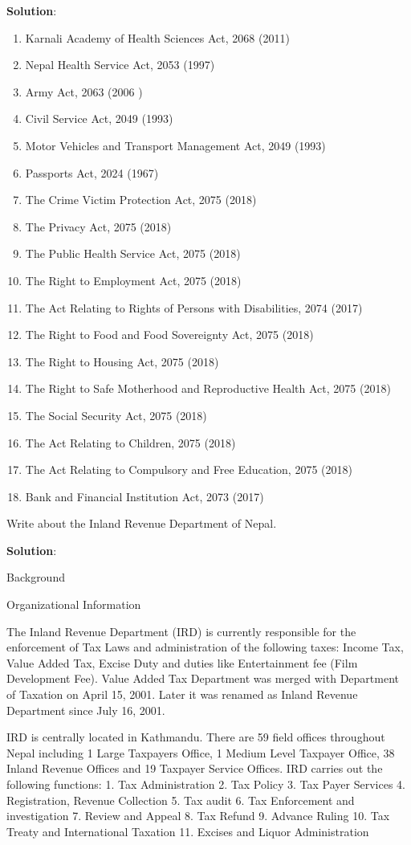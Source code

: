 \documentclass[
  openany]{book}
\newcommand{\question}{\item}
\newenvironment{solution}{ {\bfseries Solution}:}{}
\begin{document}
\begin{questions}
\begin{solution}
\begin{enumerate}
\item Karnali Academy of Health Sciences Act, 2068 (2011)
\item Nepal Health Service Act, 2053 (1997)
\item Army Act, 2063 (2006 )
\item Civil Service Act, 2049 (1993)
\item Motor Vehicles and Transport Management Act, 2049 (1993)
\item Passports Act, 2024 (1967)
\item The Crime Victim Protection Act, 2075 (2018)
\item The Privacy Act, 2075 (2018)
\item The Public Health Service Act, 2075 (2018)
\item The Right to Employment Act, 2075 (2018)
\item The Act Relating to Rights of Persons with Disabilities, 2074 (2017)
\item The Right to Food and Food Sovereignty Act, 2075 (2018)
\item The Right to Housing Act, 2075 (2018)
\item The Right to Safe Motherhood and Reproductive Health Act, 2075 (2018)
\item The Social Security Act, 2075 (2018)
\item The Act Relating to Children, 2075 (2018)
\item The Act Relating to Compulsory and Free Education, 2075 (2018)
\item Bank and Financial Institution Act, 2073 (2017)
\end{enumerate}
\end{solution}

\question Write about the Inland Revenue Department of Nepal.

\begin{solution}

Background

Organizational Information

The Inland Revenue Department (IRD) is currently responsible for the enforcement of Tax Laws and administration of the following taxes: Income Tax, Value Added Tax, Excise Duty and duties like Entertainment fee (Film Development Fee). Value Added Tax Department was merged with Department of Taxation on April 15, 2001. Later it was renamed as Inland Revenue Department since July 16, 2001.
 
IRD is centrally located in Kathmandu. There are 59 field offices throughout Nepal including 1 Large Taxpayers Office, 1 Medium Level Taxpayer Office,  38 Inland Revenue Offices and 19 Taxpayer Service Offices. IRD carries out the following functions:
1. Tax Administration
2. Tax Policy
3. Tax Payer Services
4. Registration, Revenue Collection
5. Tax audit
6. Tax Enforcement and investigation
7. Review and Appeal
8. Tax Refund
9. Advance Ruling
10. Tax Treaty and International Taxation
11. Excises and Liquor Administration


\end{solution}
\end{questions}
\end{document}
